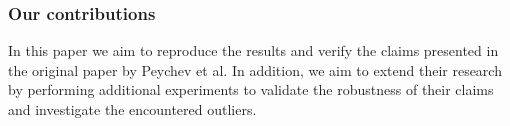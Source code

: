 



\subsubsection{Our contributions}

In this paper we aim to reproduce the results and verify the claims presented in the original paper by Peychev et al. \cite{peychev2022latent} In addition, we aim to extend their research by performing additional experiments to validate the robustness of their claims and investigate the encountered outliers.


